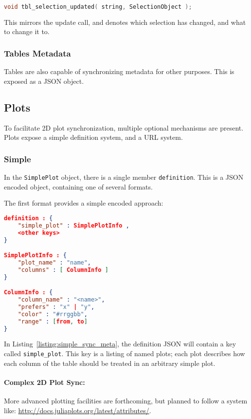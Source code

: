 \documentclass[11pt, oneside]{amsart}
\begin{document}
\begin{lstlisting}[language=c++]
	void tbl_selection_updated( string, SelectionObject );
\end{lstlisting}

This mirrors the update call, and denotes which selection has changed, and what to change it to.

\subsubsection{Tables Metadata}

Tables are also capable of synchronizing metadata for other purposes. This is exposed as a JSON object.

\subsection{Plots}

To facilitate 2D plot synchronization, multiple optional mechanisms are present. Plots expose a simple definition system, and a URL system. 

\subsubsection{Simple}

In the \texttt{SimplePlot} object, there is a single member \texttt{definition}. This is a JSON encoded object, containing one of several formats.

The first format provides a simple encoded approach:

\begin{lstlisting}[language=json, label=listing:simple_sync_meta, caption=Table Metadata for Plot Sync ]
definition : {
	"simple_plot" : SimplePlotInfo ,
	<other keys>
}

SimplePlotInfo : {
	"plot_name" : "name",
	"columns" : [ ColumnInfo ]
}

ColumnInfo : {
	"column_name" : "<name>",
	"prefers" : "x" | "y",
	"color" : "#rrggbb",
	"range" : [from, to]
}
\end{lstlisting}

In Listing~\ref{listing:simple_sync_meta}, the definition JSON will contain a key called \texttt{simple\_plot}. This key is a listing of named plots; each plot describes how each column of the table should be treated in an arbitrary simple plot.

\paragraph{Complex 2D Plot Sync:} More advanced plotting facilities are forthcoming, but planned to follow a system like:
\url{http://docs.juliaplots.org/latest/attributes/}.
\end{document}
